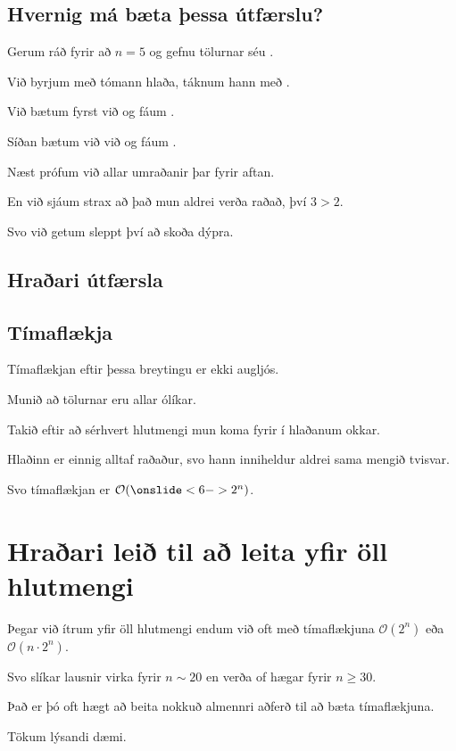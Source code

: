 \subsection{Hvernig má bæta þessa útfærslu?}
{
    {
        \item<1-> Gerum ráð fyrir að $n = 5$ og gefnu tölurnar séu .
        \item<2-> Við byrjum með tómann hlaða, táknum hann með .
        \item<3-> Við bætum fyrst við  og fáum .
        \item<4-> Síðan bætum við  við og fáum .
        \item<5-> Næst prófum við allar umraðanir  þar fyrir aftan.
        \item<6-> En við sjáum strax að það mun aldrei verða raðað, því $3 > 2$.
        \item<7-> Svo við getum sleppt því að skoða dýpra.
    }
}

\subsection{Hraðari útfærsla}
{
}

\subsection{Tímaflækja}
{
    {
        \item<1-> Tímaflækjan eftir þessa breytingu er ekki augljós.
        \item<2-> Munið að tölurnar eru allar ólíkar.
        \item<3-> Takið eftir að sérhvert hlutmengi mun koma fyrir í hlaðanum okkar.
        \item<4-> Hlaðinn er einnig alltaf raðaður, svo hann inniheldur aldrei sama mengið tvisvar.
        \item<5-> Svo tímaflækjan er $\mathcal{O}(\onslide<6->{2^n})$.
    }
}

\section{Hraðari leið til að leita yfir öll hlutmengi}
{
    {
        \item<1-> Þegar við ítrum yfir öll hlutmengi endum við oft með tímaflækjuna $\mathcal{O}(2^n)$ eða $\mathcal{O}(n \cdot 2^n)$.
        \item<2-> Svo slíkar lausnir virka fyrir $n \sim 20$ en verða of hægar fyrir $n \geq 30$.
        \item<3-> Það er þó oft hægt að beita nokkuð almennri aðferð til að bæta tímaflækjuna.
        \item<4-> Tökum lýsandi dæmi.
    }
}

